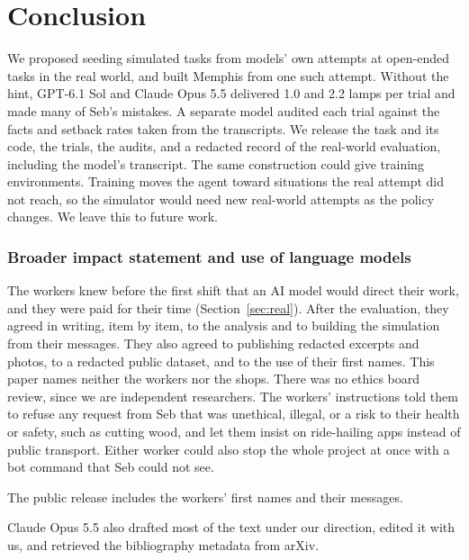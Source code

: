 \documentclass[10pt]{article}
\newif\ifanonymous
\begin{document}
\section{Conclusion}

We proposed seeding simulated tasks from models' own attempts at open-ended tasks in the real world, and built Memphis from one such attempt. Without the hint, GPT-6.1 Sol and Claude Opus 5.5 delivered 1.0 and 2.2 lamps per trial and made many of Seb's mistakes. A separate model audited each trial against the facts and setback rates taken from the transcripts. We release the task and its code, the trials, the audits, and a redacted record of the real-world evaluation, including the model's transcript. The same construction could give training environments. Training moves the agent toward situations the real attempt did not reach, so the simulator would need new real-world attempts as the policy changes. We leave this to future work.

\subsubsection*{Broader impact statement and use of language models}

The workers knew before the first shift that an AI model would direct their work, and they were paid for their time (Section~\ref{sec:real}). After the evaluation, they agreed in writing, item by item, to the analysis and to building the simulation from their messages. They also agreed to publishing redacted excerpts and photos, to a redacted public dataset, and to the use of their first names. This paper names neither the workers nor the shops. There was no ethics board review, since we are independent researchers. The workers' instructions told them to refuse any request from Seb that was unethical, illegal, or a risk to their health or safety, such as cutting wood, and let them insist on ride-hailing apps instead of public transport. Either worker could also stop the whole project at once with a bot command that Seb could not see.
\ifanonymous
The version released for review gives the workers pseudonyms and removes the client's name and address
(Appendix~\ref{app:release}).
\else
The public release includes the workers' first names and their messages.
\fi
Claude Opus 5.5 also drafted most of the text under our direction, edited it with us, and retrieved the bibliography metadata from arXiv.



\end{document}

